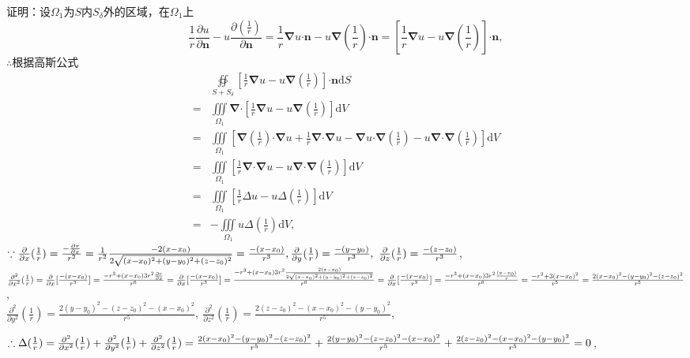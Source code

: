 \documentclass[12pt,UTF8]{ctexart}
\newcommand{\IIInt}[3]{\iiint\limits_{#1}#2\mathrm d#3}
\newcommand{\md}[1]{\mathrm d#1}
\newcommand{\pp}[2]{\frac{\partial #1}{\partial #2}}
\newcommand{\ppx}[1]{\frac{\partial #1}{\partial x}}
\newcommand{\varppx}[1]{\frac{\partial}{\partial x} #1}
\newcommand{\varppy}[1]{\frac{\partial}{\partial y} #1}
\newcommand{\varppz}[1]{\frac{\partial}{\partial z} #1}
\newcommand{\BSOIInt}[2]{\oiint\limits_{#1}#2}
\begin{document}
\begin{enumerate}
证明：设$\Omega_1$为$S$内$S_\delta$外的区域，在$\Omega_1$上
\[\frac1r\pp u{\bm n}-u\pp{(\frac1r)}{\bm n}=\frac1r\bm\nabla u\bm\cdot\bm n-u\bm\nabla(\frac1r)\bm\cdot\bm n=[\frac1r\bm\nabla u-u\bm\nabla(\frac1r)]\bm\cdot\bm n,\]
$\therefore$根据高斯公式
\[\begin{aligned}
&\BSOIInt{S+S_\delta}{[\frac1r\bm\nabla u-u\bm\nabla(\frac1r)]\bm\cdot\bm n\md S}\\
=&\IIInt{\Omega_1}{\bm\nabla\bm\cdot[\frac1r\bm\nabla u-u\bm\nabla(\frac1r)]}V\\
=&\IIInt{\Omega_1}{[\bm\nabla(\frac1r)\bm\cdot\bm\nabla u+\frac1r\bm\nabla\bm\cdot\bm\nabla u-\bm\nabla u\bm\cdot\bm\nabla(\frac1r)-u\bm\nabla\bm\cdot\bm\nabla(\frac1r)]}V\\
=&\IIInt{\Omega_1}{[\frac1r\bm\nabla\bm\cdot\bm\nabla u-u\bm\nabla\bm\cdot\bm\nabla(\frac1r)]}V\\
=&\IIInt{\Omega_1}{[\frac1r\Delta u-u\Delta(\frac1r)]}V\\
=&-\IIInt{\Omega_1}{u\Delta(\frac1r)}V,
\end{aligned}\]
$\because\varppx{(\frac1r)}=\frac{-\ppx r}{r^2}=\frac1{r^2}\frac{-2(x-x_0)}{2\sqrt{(x-x_0)^2+(y-y_0)^2+(z-z_0)^2}}=\frac{-(x-x_0)}{r^3},\\
\varppy{(\frac1r)}=\frac{-(y-y_0)}{r^3},\ \varppz{(\frac1r)}=\frac{-(z-z_0)}{r^3}$,\\
$\frac{\partial^2}{\partial x^2}(\frac1r)=\varppx{[\frac{-(x-x_0)}{r^3}]}=\frac{-r^3+(x-x_0)3r^2\ppx r}{r^6}=\varppx{[\frac{-(x-x_0)}{r^3}]}=\frac{-r^3+(x-x_0)3r^2\frac{2(x-x_0)}{2\sqrt{(x-x_0)^2+(y-y_0)^2+(z-z_0)^2}}}{r^6}\\
=\varppx{[\frac{-(x-x_0)}{r^3}]}=\frac{-r^3+(x-x_0)3r^2\frac{(x-x_0)}r}{r^6}=\frac{-r^2+3(x-x_0)^2}{r^5}=\frac{2(x-x_0)^2-(y-y_0)^2-(z-z_0)^2}{r^5}$,\\
$\frac{\partial^2}{\partial y^2}(\frac1r)=\frac{2(y-y_0)^2-(z-z_0)^2-(x-x_0)^2}{r^5},\ \frac{\partial^2}{\partial z^2}(\frac1r)=\frac{2(z-z_0)^2-(x-x_0)^2-(y-y_0)^2}{r^5}$,

$\therefore\Delta(\frac1r)=\frac{\partial^2}{\partial x^2}(\frac1r)+\frac{\partial^2}{\partial y^2}(\frac1r)+\frac{\partial^2}{\partial z^2}(\frac1r)\\
=\frac{2(x-x_0)^2-(y-y_0)^2-(z-z_0)^2}{r^5}+\frac{2(y-y_0)^2-(z-z_0)^2-(x-x_0)^2}{r^5}+\frac{2(z-z_0)^2-(x-x_0)^2-(y-y_0)^2}{r^5}=0$,


\end{enumerate}
\end{document}
